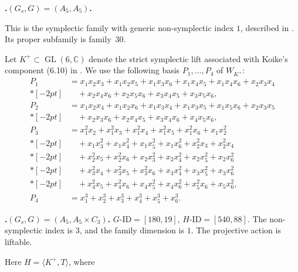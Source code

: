 \documentclass[12pt]{amsart}
\numberwithin{equation}{section}
\theoremstyle{plain}
\theoremstyle{definition}
\theoremstyle{remark}
\newcommand{\CC}{\mathbb C}
\DeclareMathOperator{\GL}{GL}
\begin{document}
\par{}\medskip\noindent\textbf{.\enspace $(G_s,G)=(A_5,A_5)$.}\label{fam:fourfold-no-29}

This is the symplectic family with generic non-symplectic index $1$,
described in \cite[(6.10)]{KOIKE202512}.  Its proper subfamily is family~30.


Let $K^+\subset\GL(6,\CC)$ denote the strict symplectic lift associated with Koike's component (6.10) in \cite{KOIKE202512}.  We use the following basis $P_1,\ldots,P_{4}$ of $W_{K^+}$:
\begin{align*}
P_{1}&={}x_{1}x_{2}x_{3}+x_{1}x_{2}x_{5}+x_{1}x_{3}x_{6}+x_{1}x_{4}x_{5}+x_{1}x_{4}x_{6}+x_{2}x_{3}x_{4}\\*[-2pt]
&\quad +x_{2}x_{4}x_{6}+x_{2}x_{5}x_{6}+x_{3}x_{4}x_{5}+x_{3}x_{5}x_{6},
\\[2pt]
P_{2}&={}x_{1}x_{2}x_{4}+x_{1}x_{2}x_{6}+x_{1}x_{3}x_{4}+x_{1}x_{3}x_{5}+x_{1}x_{5}x_{6}+x_{2}x_{3}x_{5}\\*[-2pt]
&\quad +x_{2}x_{3}x_{6}+x_{2}x_{4}x_{5}+x_{3}x_{4}x_{6}+x_{4}x_{5}x_{6},
\\[2pt]
P_{3}&={}x_{1}^{2}x_{2}+x_{1}^{2}x_{3}+x_{1}^{2}x_{4}+x_{1}^{2}x_{5}+x_{1}^{2}x_{6}+x_{1}x_{2}^{2}\\*[-2pt]
&\quad +x_{1}x_{3}^{2}+x_{1}x_{4}^{2}+x_{1}x_{5}^{2}+x_{1}x_{6}^{2}+x_{2}^{2}x_{3}+x_{2}^{2}x_{4}\\*[-2pt]
&\quad +x_{2}^{2}x_{5}+x_{2}^{2}x_{6}+x_{2}x_{3}^{2}+x_{2}x_{4}^{2}+x_{2}x_{5}^{2}+x_{2}x_{6}^{2}\\*[-2pt]
&\quad +x_{3}^{2}x_{4}+x_{3}^{2}x_{5}+x_{3}^{2}x_{6}+x_{3}x_{4}^{2}+x_{3}x_{5}^{2}+x_{3}x_{6}^{2}\\*[-2pt]
&\quad +x_{4}^{2}x_{5}+x_{4}^{2}x_{6}+x_{4}x_{5}^{2}+x_{4}x_{6}^{2}+x_{5}^{2}x_{6}+x_{5}x_{6}^{2},\\[2pt]
P_{4}&=x_{1}^{3}+x_{2}^{3}+x_{3}^{3}+x_{4}^{3}+x_{5}^{3}+x_{6}^{3}.
\end{align*}\par
\par{}\medskip\noindent\textbf{.\enspace $(G_s,G)=(A_5,\allowbreak A_5\times C_3)$.}\label{fam:fourfold-no-30}
$G\text{-ID}=[180,19]$, $H\text{-ID}=[540,88]$.
The non-symplectic index is $3$, and the family dimension is $1$.  The projective action is liftable.
\par{}\medskip\noindent Here $H=\langle K^+,T\rangle$, where\par\nopagebreak
\end{document}
